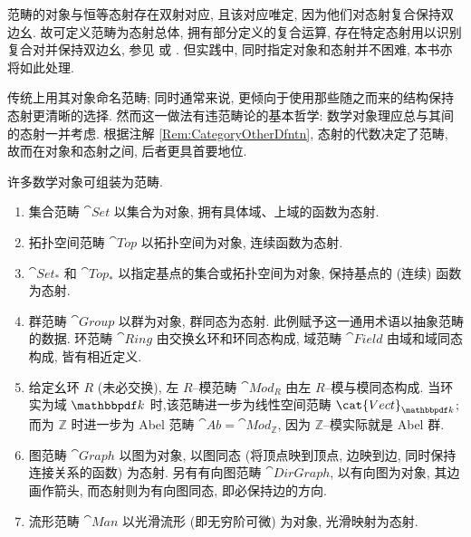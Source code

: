 \begin{remark}\label{Rem:CategoryOtherDfntn}
    范畴的对象与恒等态射存在双射对应, 且该对应唯定, 因为他们对态射复合保持双边幺. 故可定义范畴为态射总体, 拥有部分定义的复合运算, 存在特定态射用以识别复合对并保持双边幺, 参见 \cite{Ehr65} 或 \cite{FS90}. 但实践中, 同时指定对象和态射并不困难, 本书亦将如此处理.
\end{remark}
\par 传统上用其对象命名范畴; 同时通常来说, 更倾向于使用那些随之而来的结构保持态射更清晰的选择. 然而这一做法有违范畴论的基本哲学: 数学对象理应总与其间的态射一并考虑. 根据注解 \ref{Rem:CategoryOtherDfntn}, 态射的代数决定了范畴, 故而在对象和态射之间, 后者更具首要地位.

\begin{example}\label{Expl:Concrete.Category}
    许多数学对象可组装为范畴.
    \begin{enumerate}[label={(\roman*)}, ref = {(\roman*)}]
        \item 集合范畴 \(\cat{Set}\) 以集合为对象, 拥有具体域、上域的函数为态射.
        \item 拓扑空间范畴 \(\cat{Top}\) 以拓扑空间为对象, 连续函数为态射.
        \item \(\cat{Set}_*\) 和 \(\cat{Top}_*\) 以指定基点的集合或拓扑空间为对象, 保持基点的 (连续) 函数为态射.
        \item 群范畴 \(\cat{Group}\) 以群为对象, 群同态为态射. 此例赋予这一通用术语以抽象范畴的数据. 环范畴 \(\cat{Ring}\) 由交换幺环和环同态构成, 域范畴 \(\cat{Field}\) 由域和域同态构成, 皆有相近定义.
        \item 给定幺环 \(R\) (未必交换), 左 \(R\)--模范畴 \(\cat{Mod}_R\) 由左 \(R\)--模与模同态构成. 当环实为域 \(\mathbbpdf k\) 时,该范畴进一步为线性空间范畴 \(\cat{Vect}_{\mathbbpdf k}\); 而为 \(\mathbb Z\) 时进一步为 Abel 范畴 \(\cat{Ab} =\cat{Mod}_{\mathbb Z}\), 因为 \(\mathbb Z\)--模实际就是 Abel 群.
        \item 图范畴 \(\cat{Graph}\) 以图为对象, 以图同态 (将顶点映到顶点, 边映到边, 同时保持连接关系的函数) 为态射. 另有有向图范畴 \(\cat{DirGraph}\), 以有向图为对象, 其边画作箭头, 而态射则为有向图同态, 即必保持边的方向.
        \item 流形范畴 \(\cat{Man}\) 以光滑流形 (即无穷阶可微) 为对象, 光滑映射为态射.

\end{enumerate}
\end{example}
